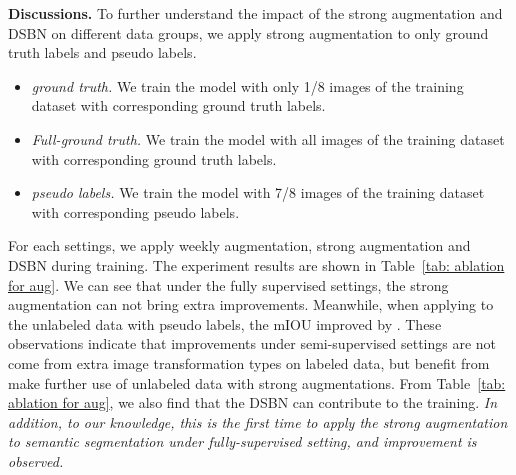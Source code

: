 \documentclass[10pt,twocolumn,letterpaper]{article}
\begin{document}
{\noindent\textbf{Discussions.}
To further understand the impact of the strong augmentation and DSBN on different data groups, we apply strong augmentation to only ground truth labels and pseudo labels.
\begin{itemize}
    \item \textit{ ground truth.} We train the model with only 1/8 images of the training dataset with corresponding ground truth labels.
    \item \textit{Full-ground truth.} We train the model with all images of the training dataset with corresponding ground truth labels.
    \item \textit{ pseudo labels.} We train the model with 7/8 images of the training dataset with corresponding pseudo labels.
\end{itemize}

For each settings, we apply weekly augmentation, strong augmentation and DSBN during training. The experiment results are shown in Table~\ref{tab: ablation for aug}. We can see that under the fully supervised settings, the strong augmentation can not bring extra improvements. Meanwhile, when applying to the unlabeled data with pseudo labels, the mIOU improved by . These observations indicate that improvements under semi-supervised settings are not come from extra image transformation types on labeled data, but benefit from make further use of unlabeled data with strong augmentations.
From Table~\ref{tab: ablation for aug}, we also find that the DSBN can contribute to the training.
\textit{In addition, to our knowledge,  
this is the first time to apply the strong augmentation to semantic segmentation under fully-supervised setting, and improvement is observed.}

\begin{table}[t]
\begin{center}
\end{center}
\end{table}}
\end{document}

